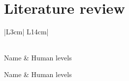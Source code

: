 \section{Literature review}
\label{literature_review}
\begin{center}


\begin{longtable}{|L{3cm}|%
L{14cm}|}
\caption{Human xenobiotic levels}\\

\hline
Name & %
Human levels \\
\hline
\hline
\endfirsthead

\hline
Name & %
Human levels \\
\hline
\hline
\endhead

\hline {} \\ \hline
\endfoot

\hline \hline
\endlastfoot



\end{longtable}
\end{center}
